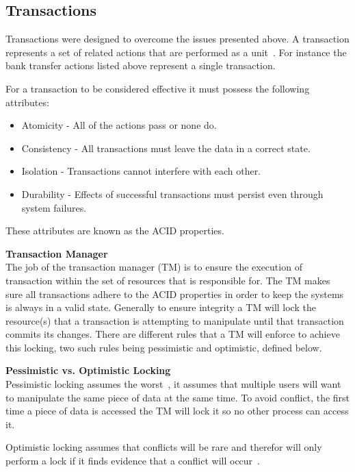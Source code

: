 \documentclass[a4paper,12pt]{article}
\begin{document}
\subsection*{Transactions}
Transactions were designed to overcome the issues presented above.
A transaction represents a set of related actions that are performed as a unit~\citep{nested-transactions}.
For instance the bank transfer actions listed above represent a single transaction. 

For a transaction to be considered effective it must possess the following attributes:
\begin{itemize} 
    \item{Atomicity - All of the actions pass or none do.}
    \item{Consistency - All transactions must leave the data in a correct state.}
    \item{Isolation - Transactions cannot interfere with each other.}
    \item{Durability - Effects of successful transactions must persist even through system failures.}
\end{itemize}
These attributes are known as the ACID properties.

\par\textbf{Transaction Manager}\\
The job of the transaction manager (TM) is to ensure the execution of transaction within the set of resources that is responsible for.
The TM makes sure all transactions adhere to the ACID properties in order to keep the systems is always in a valid state.
Generally to ensure integrity a TM will lock the resource(s) that a transaction is attempting to manipulate until that transaction commits its changes.
There are different rules that a TM will enforce to achieve this locking, two such rules being pessimistic and optimistic, defined below.

\par\textbf{Pessimistic vs. Optimistic Locking}\\
Pessimistic locking assumes the worst~\citep{pessimistic-vs-optimistic}, it assumes that multiple users will want to manipulate the same piece of data at the same time. To avoid conflict, the first time a piece of data is accessed the TM will lock it so no other process can access it.

Optimistic locking assumes that conflicts will be rare and therefor will only perform a lock if it finds evidence that a conflict will occur~\citep{pessimistic-vs-optimistic}.
\end{document}
